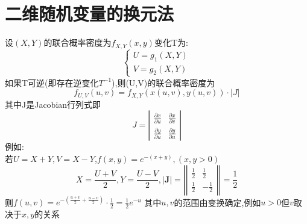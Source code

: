 \documentclass[12pt, a4paper, oneside, UTF8]{ctexbook}
\begin{document}
\section{二维随机变量的换元法}
设$(X,Y)$的联合概率密度为$f_{X,Y}(x,y)$变化T为:
\[
\begin{cases}
    U=g_1(X,Y) \\
    V=g_2(X,Y)
\end{cases}
\]
如果T可逆(即存在逆变化$T^{-1}$),则(U,V)的联合概率密度为
\[
f_{U,V}(u,v)=f_{X,Y}(x(u,v),y(u,v))\cdot \left|J\right|
\]
其中J是Jacobian行列式即
\[
J=\left|\begin{array}{cc}
    \frac{\partial x}{\partial u} & \frac{\partial x}{\partial v} \\
    \frac{\partial y}{\partial u} & \frac{\partial y}{\partial u}
\end{array}\right|
\]
例如: \\
    若$U=X+Y,V=X-Y$,$f(x,y)=e^{-(x+y)},(x,y > 0)$
    \[
    X=\frac{U+V}{2}, Y=\frac{U-V}{2},\left|\mathbf{J}\right|=\left|\left|\begin{array}{cc}
        \frac{1}{2} & \frac{1}{2} \\
        \frac{1}{2} & -\frac{1}{2}
    \end{array}\right|\right| = \frac{1}{2}
    \]
    则$f(u,v)=e^{-(\frac{u+v}{2}+\frac{u-v}{2})}\cdot\frac{1}{2}=\frac{1}{2}e^{-u}$
    其中$u,v$的范围由变换确定,例如$u>0$但$v$取决于$x,y$的关系
\end{document}
